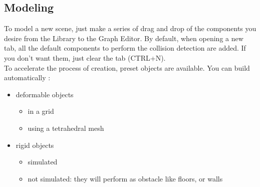 \subsection{Modeling}
To model a new scene, just make a series of drag and drop of the components you desire from the Library to the Graph Editor. By default, when opening a new tab, all the default components to perform the collision detection are added. If you don't want them, just clear the tab (CTRL+N).\\
To accelerate the process of creation, preset objects are available. You can build automatically :
\begin{itemize}
  \item deformable objects
  \begin{itemize}
    \item in a grid
    \item using a tetrahedral mesh
  \end{itemize}
  \item rigid objects  
  \begin{itemize}
    \item simulated
    \item not simulated: they will perform as obstacle like floors, or walls
  \end{itemize}
\end{itemize}

